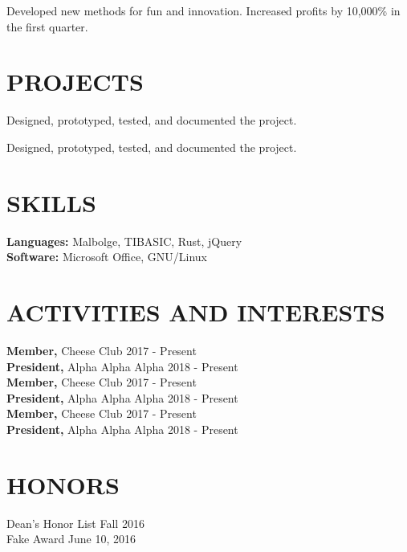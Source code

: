 \documentclass{res}
\begin{document}
\begin{resume}
    \begin{position}
        Developed new methods for fun and innovation. Increased profits by
        10,000\% in the first quarter.
    \end{position}

\section{PROJECTS}


    \location{}                      %
    \begin{position}
        Designed, prototyped, tested, and documented the project.
    \end{position}

    \location{}                      %
    \begin{position}
        Designed, prototyped, tested, and documented the project.
    \end{position}

\section{SKILLS}
    {\bf Languages:} Malbolge, TIBASIC, Rust, jQuery \\
    {\bf Software:} Microsoft Office, GNU/Linux

\section{ACTIVITIES AND INTERESTS}
    {\bf Member,} Cheese Club \hfill 2017 - Present \\
    {\bf President,} Alpha Alpha Alpha \hfill   2018 - Present\\
    {\bf Member,} Cheese Club \hfill 2017 - Present \\
    {\bf President,} Alpha Alpha Alpha \hfill   2018 - Present\\
    {\bf Member,} Cheese Club \hfill 2017 - Present \\
    {\bf President,} Alpha Alpha Alpha \hfill   2018 - Present

\section{HONORS}
    Dean's Honor List \hfill Fall 2016 \\
    Fake Award \hfill June 10, 2016

\end{resume}
\end{document}
